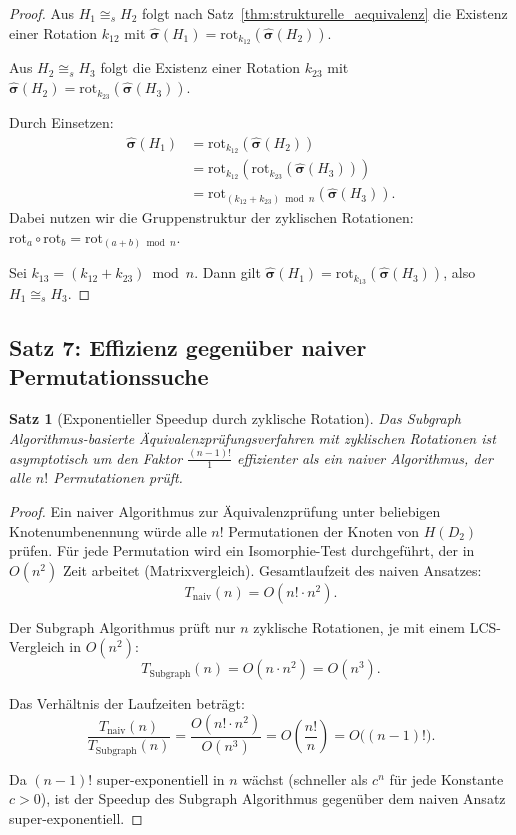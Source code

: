 ﻿\documentclass[12pt,a4paper]{report}
\newtheorem{theorem}{Satz}[section]
\begin{document}
\begin{proof}
Aus $H_1 \cong_s H_2$ folgt nach Satz~\ref{thm:strukturelle_aequivalenz} die Existenz einer Rotation $k_{12}$ mit $\hat{\boldsymbol{\sigma}}(H_1) = \mathrm{rot}_{k_{12}}(\hat{\boldsymbol{\sigma}}(H_2))$.

Aus $H_2 \cong_s H_3$ folgt die Existenz einer Rotation $k_{23}$ mit $\hat{\boldsymbol{\sigma}}(H_2) = \mathrm{rot}_{k_{23}}(\hat{\boldsymbol{\sigma}}(H_3))$.

Durch Einsetzen:
\begin{align*}
\hat{\boldsymbol{\sigma}}(H_1) &= \mathrm{rot}_{k_{12}}(\hat{\boldsymbol{\sigma}}(H_2)) \\
&= \mathrm{rot}_{k_{12}}\!\left(\mathrm{rot}_{k_{23}}(\hat{\boldsymbol{\sigma}}(H_3))\right) \\
&= \mathrm{rot}_{(k_{12} + k_{23}) \bmod n}(\hat{\boldsymbol{\sigma}}(H_3)).
\end{align*}
Dabei nutzen wir die Gruppenstruktur der zyklischen Rotationen: $\mathrm{rot}_a \circ \mathrm{rot}_b = \mathrm{rot}_{(a+b) \bmod n}$.

Sei $k_{13} = (k_{12} + k_{23}) \bmod n$. Dann gilt $\hat{\boldsymbol{\sigma}}(H_1) = \mathrm{rot}_{k_{13}}(\hat{\boldsymbol{\sigma}}(H_3))$, also $H_1 \cong_s H_3$.
\end{proof}

\subsection{Satz 7: Effizienz gegenüber naiver Permutationssuche}

\begin{theorem}[Exponentieller Speedup durch zyklische Rotation]
\label{thm:speedup}
Das Subgraph Algorithmus-basierte Äquivalenzprüfungsverfahren mit zyklischen Rotationen ist asymptotisch um den Faktor $\frac{(n-1)!}{1}$ effizienter als ein naiver Algorithmus, der alle $n!$ Permutationen prüft.
\end{theorem}

\begin{proof}
Ein naiver Algorithmus zur Äquivalenzprüfung unter beliebigen Knotenumbenennung würde alle $n!$ Permutationen der Knoten von $H(D_2)$ prüfen. Für jede Permutation wird ein Isomorphie-Test durchgeführt, der in $O(n^2)$ Zeit arbeitet (Matrixvergleich). Gesamtlaufzeit des naiven Ansatzes:
\[
T_{\mathrm{naiv}}(n) = O(n! \cdot n^2).
\]

Der Subgraph Algorithmus prüft nur $n$ zyklische Rotationen, je mit einem LCS-Vergleich in $O(n^2)$:
\[
T_{\mathrm{Subgraph}}(n) = O(n \cdot n^2) = O(n^3).
\]

Das Verhältnis der Laufzeiten beträgt:
\[
\frac{T_{\mathrm{naiv}}(n)}{T_{\mathrm{Subgraph}}(n)} = \frac{O(n! \cdot n^2)}{O(n^3)} = O\!\left(\frac{n!}{n}\right) = O\bigl((n-1)!\bigr).
\]

Da $(n-1)!$ super-exponentiell in $n$ wächst (schneller als $c^n$ für jede Konstante $c > 0$), ist der Speedup des Subgraph Algorithmus gegenüber dem naiven Ansatz super-exponentiell.
\end{proof}
\end{document}
